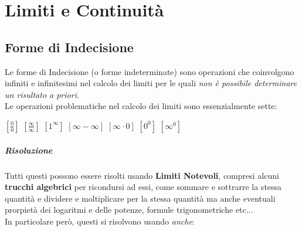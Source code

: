 \documentclass[12pt, a4paper, openany]{book}
\begin{document}

\chapter{Limiti e Continuità}

\section{Forme di Indecisione}
\label{sec:forme_di_indecisione}
Le forme di Indecisione (o forme indeterminate) sono operazioni che coinvolgono infiniti e infinitesimi nel calcolo dei limiti per le quali \emph{non è possibile determinare un risultato a priori}.
\\Le operazioni problematiche nel calcolo dei limiti sono essenzialmente sette:
\begin{center}
	$[\frac{0}{0}]$ $[\frac{\infty}{\infty}]$ $[1^\infty]$ $[\infty - \infty]$ $[\infty \cdot 0]$ $[0^0]$ $[\infty^0]$
\end{center}

\paragraph{Risoluzione}Tutti questi possono essere risolti usando \textbf{Limiti Notevoli}, compresi alcuni \textbf{trucchi algebrici} per ricondursi ad essi,
come sommare e sottrarre la stessa quantità e dividere e moltiplicare per la stessa quantità
ma anche eventuali prorpietà dei logaritmi e delle potenze, formule trigonometriche etc...
\\In particolare però, questi si risolvono usando \emph{anche}:
\end{document}
